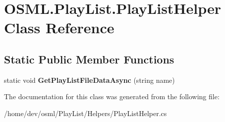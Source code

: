 \hypertarget{classOSML_1_1PlayList_1_1PlayListHelper}{}\section{O\+S\+M\+L.\+Play\+List.\+Play\+List\+Helper Class Reference}
\label{classOSML_1_1PlayList_1_1PlayListHelper}
\subsection*{Static Public Member Functions}
\begin{DoxyCompactItemize}
\item 
\mbox{\label{classOSML_1_1PlayList_1_1PlayListHelper_abb1a6ebc69a94eac621bb6ccbbbd8f6a}} 
static void {\bfseries Get\+Play\+List\+File\+Data\+Async} (string name)
\end{DoxyCompactItemize}


The documentation for this class was generated from the following file\+:\begin{DoxyCompactItemize}
\item 
/home/dev/osml/\+Play\+List/\+Helpers/Play\+List\+Helper.\+cs\end{DoxyCompactItemize}
